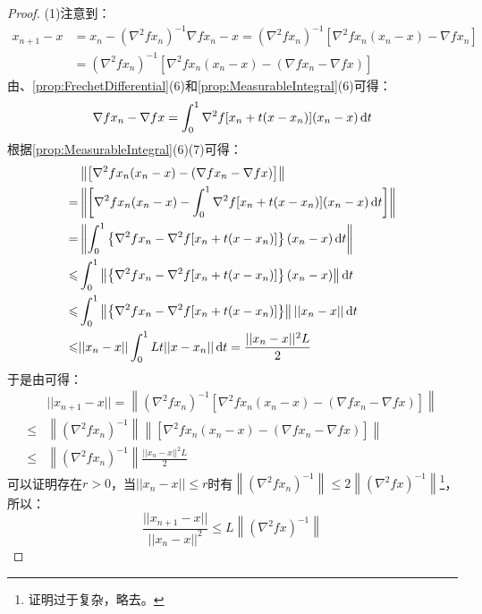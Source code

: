 \begin{proof}
	(1)注意到：
	\begin{align*}
		x_{n+1}-x&=x_n-\left(\nabla^2fx_n\right)^{-1}\nabla fx_n-x=\left(\nabla^2fx_n\right)^{-1}\left[\nabla^2fx_n(x_n-x)-\nabla fx_n\right] \\
		&=\left(\nabla^2fx_n\right)^{-1}\left[\nabla^2fx_n(x_n-x)-\left(\nabla fx_n-\nabla fx\right)\right]
	\end{align*}
	由、\cref{prop:FrechetDifferential}(6)和\cref{prop:MeasurableIntegral}(6)可得：
	\begin{equation*}
		\nabla fx_n-\nabla fx=\int_{0}^{1}\nabla^2f[x_n+t(x-x_n)](x_n-x)\mathop{}\!\mathrm{d} t
	\end{equation*}
	根据\cref{prop:MeasurableIntegral}(6)(7)可得：
	\begin{align*}
		&\left\|\left[\nabla^2fx_n(x_n-x)-\left(\nabla fx_n-\nabla fx\right)\right]\right\| \\
		=&\left\|\left[\nabla^2fx_n(x_n-x)-\int_{0}^{1}\nabla^2f[x_n+t(x-x_n)](x_n-x)\mathop{}\!\mathrm{d} t\right]\right\| \\
		=&\left\|\int_{0}^{1}\left\{\nabla^2fx_n-\nabla^2f[x_n+t(x-x_n)]\right\}(x_n-x)\mathop{}\!\mathrm{d} t\right\| \\
		\leqslant&\int_{0}^{1}\left\|\left\{\nabla^2fx_n-\nabla^2f[x_n+t(x-x_n)]\right\}(x_n-x)\right\|\mathop{}\!\mathrm{d} t \\
		\leqslant&\int_{0}^{1}\left\|\left\{\nabla^2fx_n-\nabla^2f[x_n+t(x-x_n)]\right\}\right\|||x_n-x||\mathop{}\!\mathrm{d} t \\
		\leqslant&||x_n-x||\int_{0}^{1}Lt||x-x_n||\mathop{}\!\mathrm{d} t=\frac{||x_n-x||^2L}{2}
	\end{align*}
	于是由可得：
	\begin{align*}
		&||x_{n+1}-x||=\left\|\left(\nabla^2fx_n\right)^{-1}\left[\nabla^2fx_n(x_n-x)-\left(\nabla fx_n-\nabla fx\right)\right]\right\| \\
		\leqslant&\left\|\left(\nabla^2fx_n\right)^{-1}\right\|\left\|\left[\nabla^2fx_n(x_n-x)-\left(\nabla fx_n-\nabla fx\right)\right]\right\|  \\
		\leqslant&\left\|\left(\nabla^2fx_n\right)^{-1}\right\|\frac{||x_n-x||^2L}{2}
	\end{align*}
	可以证明存在$r>0$，当$||x_n-x||\leqslant r$时有$\left\|\left(\nabla^2fx_n\right)^{-1}\right\|\leqslant2\left\|\left(\nabla^2fx\right)^{-1}\right\|$\footnote{证明过于复杂，略去。}，所以：
	\begin{equation*}
		\frac{||x_{n+1}-x||}{||x_n-x||^2}\leqslant L\left\|\left(\nabla^2fx\right)^{-1}\right\|

\end{equation*}
\end{proof}
